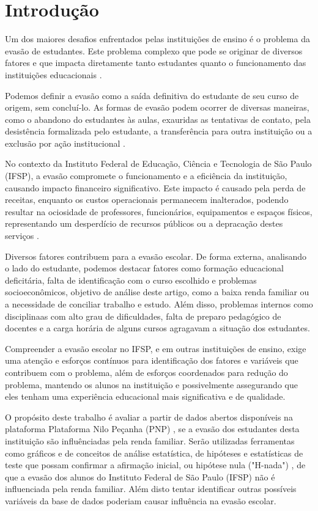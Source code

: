 \documentclass[conference]{IEEEtran}
\begin{document}
\section{Introdução}
Um dos maiores desafios enfrentados pelas instituições de ensino é o problema da evasão de estudantes. Este problema complexo que pode se originar de diversos fatores e que impacta diretamente tanto estudantes quanto o funcionamento das instituições educacionais \cite{oliveira2021}.\par
Podemos definir a evasão como a saída definitiva do estudante de seu curso de origem, sem concluí-lo. As formas de evasão podem ocorrer de diversas maneiras, como o abandono do estudantes às aulas, exauridas as tentativas de contato, pela desistência formalizada pelo estudante, a transferência para outra instituição ou a exclusão por ação institucional \cite{silveira2021}.\par
No contexto da Instituto Federal de Educação, Ciência e Tecnologia de São Paulo (IFSP), a evasão compromete o funcionamento e a eficiência da instituição, causando impacto financeiro significativo. Este impacto é causado pela perda de receitas, enquanto os custos operacionais permanecem inalterados, podendo resultar na ociosidade de professores, funcionários, equipamentos e espaços físicos, representando um desperdício de recursos públicos ou a depracação destes serviços \cite{silveira2021}.\par
Diversos fatores contribuem para a evasão escolar. De forma externa, analisando o lado do estudante, podemos destacar fatores como formação educacional deficitária, falta de identificação com o curso escolhido e problemas socioeconômicos, objetivo de análise deste artigo, como a baixa renda familiar ou a necessidade de conciliar trabalho e estudo. Além disso, problemas internos como disciplinaas com alto grau de dificuldades, falta de preparo pedagógico de docentes e a carga horária de alguns cursos agragavam a situação dos estudantes.\par
Compreender a evasão escolar no IFSP, e em outras instituições de ensino, exige uma atenção e esforços contínuos para identificação dos fatores e variáveis que contribuem com o problema, além de esforços coordenados para redução do problema, mantendo os alunos na instituição e possivelmente assegurando que eles tenham uma experiência educacional mais significativa e de qualidade.\par
O propósito deste trabalho é avaliar a partir de dados abertos disponíveis na plataforma Plataforma Nilo Peçanha (PNP) \cite{pnp2024}, 
se a evasão dos estudantes desta instituição são influênciadas pela renda familiar. Serão utilizadas ferramentas como gráficos e de conceitos de análise estatística, de hipóteses e estatísticas de teste que possam confirmar a afirmação inicial, ou hipótese nula ("H-nada") \cite{ismay2024}, de que a evasão dos alunos do Instituto Federal de São Paulo (IFSP) não é influenciada pela renda familiar. Além disto tentar identificar outras possíveis variáveis da base de dados poderiam causar influência na evasão escolar.\par
\end{document}

